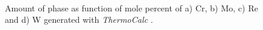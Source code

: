 \begin{figure}[H]
  \centering
   \\
  \caption{Amount of phase as function of mole percent of a) Cr, b) Mo, c) Re and d) W generated with \textit{ThermoCalc} \citep{thermocalc}.}
  \label{fig:diagram04}
\end{figure}

